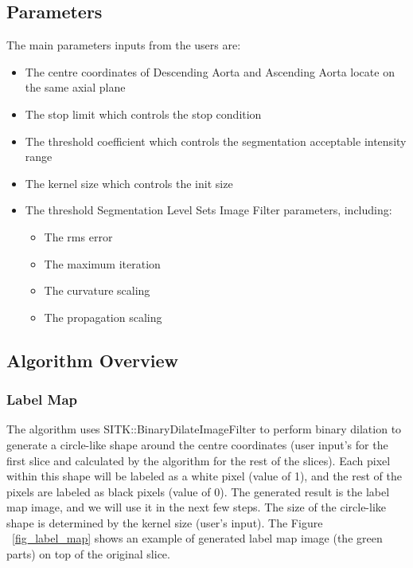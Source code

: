 \subsection{Parameters}
The main parameters inputs from the users are:
\begin{itemize}
\item The centre coordinates of Descending Aorta and Ascending Aorta locate on the same axial plane
\item The stop limit which controls the stop condition
\item The threshold coefficient which controls the segmentation acceptable intensity range
\item The kernel size which controls the init size 
\item The threshold Segmentation Level Sets Image Filter parameters, including:
\begin{itemize}
\item The rms error
\item The maximum iteration
\item The curvature scaling
\item The propagation scaling
\end{itemize}
\end{itemize}


\subsection{Algorithm Overview}

\subsubsection{Label Map}
The algorithm uses SITK::BinaryDilateImageFilter to perform binary dilation to generate a circle-like shape around the centre coordinates (user input’s for the first slice and calculated by the algorithm for the rest of the slices). Each pixel within this shape will be labeled as a white pixel (value of 1), and the rest of the pixels are labeled as black pixels (value of 0). The generated result is the label map image, and we will use it in the next few steps. The size of the circle-like shape is determined by the kernel size (user's input). The Figure ~\ref{fig_label_map} shows an example of generated label map image (the green parts) on top of the original slice.

